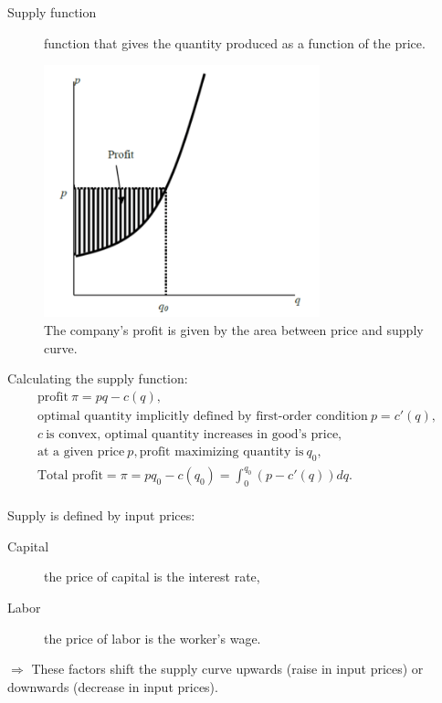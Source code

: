 \documentclass[12pt, a4paper, titlepage]{extarticle}
\begin{document}
	\begin{description}
		\item[Supply function] function that gives the quantity produced as a function of the price. 
	\end{description}
	\begin{figure}[h]
	\centering
		\includegraphics[width=8cm]{pricesupplyprofit}
		\caption{The company's profit is given by the area between price and supply curve. \label{imgPriceSupplyProfit}}
	\end{figure}
	Calculating the supply function:\\
	\begin{equation}
		\begin{gathered}
			\text{profit}\ \pi = pq - c(q), \\ 
			\text{optimal quantity implicitly defined by first-order condition}\ p = c'(q),\\
			c\ \text{is convex, optimal quantity increases in good's price},\\
			\text{at a given price}\ p, \text{profit maximizing quantity is}\ q_0,\\
			\text{Total profit} = \pi = pq_0 - c(q_0) = \int_0^{q_0}(p - c'(q))dq.
		\end{gathered}
	\end{equation}
	\\
	Supply is defined by input prices:
	
	\begin{description}
		\item[Capital] the price of capital is the interest rate,
		\item[Labor] the price of labor is the worker's wage.
	\end{description}
	$\Rightarrow$ These factors shift the supply curve upwards (raise in input prices) or downwards (decrease in input prices).\\
	
\end{document}
